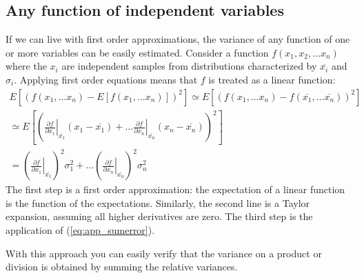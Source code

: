 \subsection{Any function of independent variables}
If we can live with first order approximations, the variance of any function
of one or more variables can be easily estimated. Consider a function
$f(x_1, x_2, \ldots x_n)$ where the $x_i$ are independent samples from
distributions characterized by $\overline{x_i}$ and $\sigma_i$. Applying first order
equations means that $f$ is treated as a linear function:
\begin{align}
  E\left[\left( f(x_1, \ldots x_n) - E\left[f(x_1, \ldots x_n)\right]\right)^2\right]
  \simeq  E\left[\left( f(x_1,\ldots x_n) 
        - f(\overline{x_1}, \ldots \overline{x_n})\right)^2\right] \nonumber \\
  \simeq  E\left[\left( \left. \frac{\partial f}{\partial x_1} \right|_{\overline{x_1}}
                 (x_1 - \overline{x_1}) + \ldots
            \left. \frac{\partial f}{\partial x_n} \right|_{\overline{x_n}}
                 (x_n - \overline{x_n}) \right)^2\right] \nonumber \\
  = \left( \left. \frac{\partial f}{\partial x_1} \right|_{\overline{x_1}} \right)^2
        \sigma_1^2 + \ldots
    \left( \left. \frac{\partial f}{\partial x_n} \right|_{\overline{x_n}} \right)^2
         \sigma_n^2
\end{align}
The first step is a first order approximation: the expectation of a linear
function is the function of the expectations. Similarly, the second line is a
Taylor expansion, assuming all higher derivatives are zero. The third step is
the application of (\ref{eq:app_sumerror}).

With this approach you can easily verify that the variance on a product or
division is obtained by summing the relative variances.

\newpage
